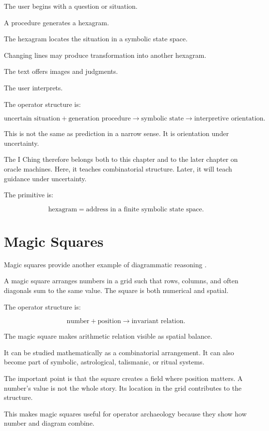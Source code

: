 \documentclass[11pt]{book}
\begin{document}
The user begins with a question or situation.

A procedure generates a hexagram.

The hexagram locates the situation in a symbolic state space.

Changing lines may produce transformation into another hexagram.

The text offers images and judgments.

The user interprets.

The operator structure is:

\[
\text{uncertain situation}
+
\text{generation procedure}
\rightarrow
\text{symbolic state}
\rightarrow
\text{interpretive orientation}.
\]

This is not the same as prediction in a narrow sense. It is orientation under uncertainty.

The I Ching therefore belongs both to this chapter and to the later chapter on oracle machines. Here, it teaches combinatorial structure. Later, it will teach guidance under uncertainty.

The primitive is:

\[
\text{hexagram} = \text{address in a finite symbolic state space}.
\]

\section{Magic Squares}

Magic squares provide another example of diagrammatic reasoning \cite{Needham1959ScienceCivilisationChina3,Eco1995SearchPerfectLanguage}.

A magic square arranges numbers in a grid such that rows, columns, and often diagonals sum to the same value. The square is both numerical and spatial.

The operator structure is:

\[
\text{number}
+
\text{position}
\rightarrow
\text{invariant relation}.
\]

The magic square makes arithmetic relation visible as spatial balance.

It can be studied mathematically as a combinatorial arrangement. It can also become part of symbolic, astrological, talismanic, or ritual systems.

The important point is that the square creates a field where position matters. A number's value is not the whole story. Its location in the grid contributes to the structure.

This makes magic squares useful for operator archaeology because they show how number and diagram combine.
\end{document}
